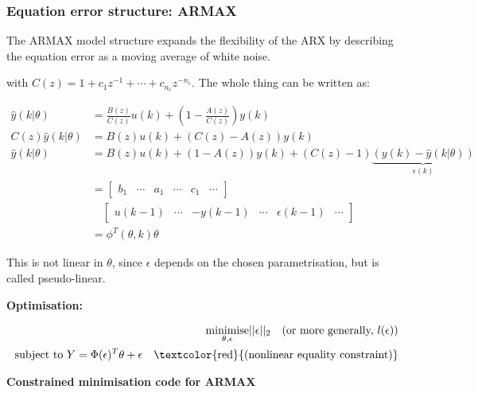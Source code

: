 \documentclass[10pt,a4paper]{scrartcl}
\begin{document}
\begin{multicols*}{2}
\subsubsection{Equation error structure: ARMAX}


The ARMAX model structure expands the flexibility of the ARX by describing the equation error as a moving average of white noise.


with $C(z) = 1+c_1z^{-1}+\cdots+c_{n_c}z^{-n_c}$. The whole thing can be written as:


\begin{align*}
\hat{y}(k|\theta)&=\frac{B(z)}{C(z)}u(k)+\left(1-\frac{A(z)}{C(z)}\right)y(k)\\
C(z)\hat{y}(k|\theta)&=B(z)u(k)+(C(z)-A(z))y(k)\\
\hat{y}(k|\theta)&=B(z)u(k)+(1-A(z))y(k)+(C(z)-1)\underbrace{(y(k)-\hat{y}(k|\theta))}_{\epsilon(k)}\\
&=\begin{bmatrix}
b_1&\cdots&a_1&\cdots&c_1&\cdots
\end{bmatrix}\\
&\quad\begin{bmatrix}
u(k-1)&\cdots&-y(k-1)&\cdots&\epsilon(k-1)&\cdots
\end{bmatrix}\\
&=\phi^T(\theta,k)\theta
\end{align*}

This is not linear in $\theta$, since $\epsilon$ depends on the chosen parametrisation, but is called pseudo-linear.

\textbf{Optimisation:}

\begin{align*}
\underset{\theta,\epsilon}{\text{minimise}}||\epsilon||_2\quad \text{(or more generally, $l(\epsilon)$)}\\
\text{subject to }Y=\Phi(\epsilon)^T\theta+\epsilon\quad\text{\textcolor{red}{(nonlinear equality constraint)}}
\end{align*}

\textbf{Constrained minimisation code for ARMAX}


\end{multicols*}
\end{document}
